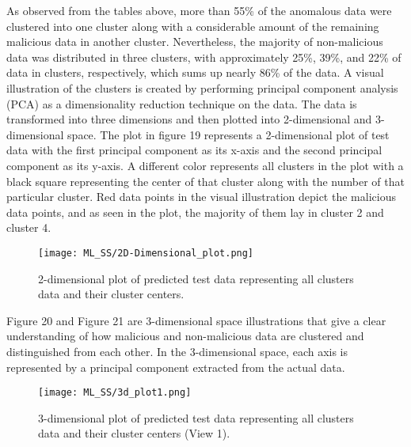 \documentclass[journal]{IEEEtran}
\begin{document}
As observed from the tables above, more than 55\% of the anomalous data were clustered into one cluster along with a considerable amount of the remaining malicious data in another cluster. Nevertheless, the majority of non-malicious data was distributed in three clusters, with approximately 25\%, 39\%, and 22\% of data in clusters, respectively, which sums up nearly 86\% of the data. A visual illustration of the clusters is created by performing principal component analysis (PCA) as a dimensionality reduction technique on the data. The data is transformed into three dimensions and then plotted into 2-dimensional and 3- dimensional space. The plot in figure 19 represents a 2-dimensional plot of test data with the first principal component as its x-axis and the second principal component as its y-axis. A different color represents all clusters in the plot with a black square representing the center of that cluster along with the number of that particular cluster. Red data points in the visual illustration depict the malicious data points, and as seen in the plot, the majority of them lay in cluster 2 and cluster 4.

\begin{figure}[h!] %
    \centering
    \texttt{[image: ML\_SS/2D-Dimensional\_plot.png]}%
    \caption{2-dimensional plot of predicted test data representing all clusters data and their cluster centers.}
    \label{fig:autoencoder-structure}
\end{figure}
Figure 20 and Figure 21 are 3-dimensional space illustrations that give a clear understanding of how malicious and non-malicious data are clustered and distinguished from each other. In the 3-dimensional space, each axis is represented by a principal component extracted from the actual data.
\begin{figure}[h!] %
    \centering
    \texttt{[image: ML\_SS/3d\_plot1.png]}%
    \caption{3-dimensional plot of predicted test data representing all clusters data and their cluster centers (View 1).}
    \label{fig:autoencoder-structure}
\end{figure}
\end{document}
